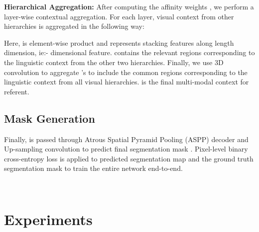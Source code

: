 \documentclass[11pt]{article}
\begin{document}
\textbf{Hierarchical Aggregation:} After computing the affinity weights , we perform a layer-wise contextual aggregation. For each layer, visual context from other hierarchies is aggregated in the following way:

Here,  is element-wise product and  represents stacking features along length dimension, ie:-  dimensional feature.  contains the relevant regions corresponding to the linguistic context from the other two hierarchies. Finally, we use 3D convolution to aggregate 's to include the common regions corresponding to the linguistic context from all visual hierarchies.  is the final multi-modal context for referent.




\subsection{Mask Generation}
Finally,  is passed through Atrous Spatial Pyramid Pooling (ASPP) decoder \cite{chen2018encoderdecoder} and Up-sampling convolution to predict final segmentation mask . Pixel-level binary cross-entropy loss is applied to predicted segmentation map  and the ground truth segmentation mask  to train the entire network end-to-end.

~\vspace{-1.5em}

\section{Experiments}
\end{document}
